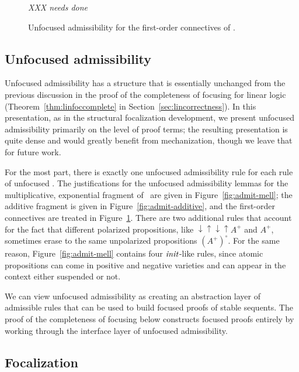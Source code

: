 \begin{figure}[tp]
\centering
{\it XXX needs done}

\caption{Unfocused admissibility for the first-order connectives of \ollll.}
\label{fig:admit-fo}
\end{figure}

\subsection{Unfocused admissibility}
\label{sec:ord-unfocused-admissibility}

Unfocused admissibility has a structure that is essentially unchanged
from the previous discussion in the proof of the completeness of
focusing for linear logic (Theorem~\ref{thm:linfoccomplete} in
Section~\ref{sec:lincorrectness}). In this presentation, as in the
structural focalization development, we present unfocused
admissibility primarily on the level of proof terms; the resulting
presentation is quite dense and would greatly benefit from 
mechanization, though we leave that for future work. 

For the most part, there is exactly one unfocused admissibility rule
for each rule of unfocused \ollll. 
The justifications for the 
unfocused admissibility lemmas for the multiplicative, exponential
fragment of \ollll~are given in Figure~\ref{fig:admit-mell}; the
additive fragment is given in Figure~\ref{fig:admit-additive}, and
the first-order connectives are treated in Figure~\ref{fig:admit-fo}.
There are two additional
rules that account for the fact that different polarized
propositions, like ${\downarrow}{\uparrow}{\downarrow}{\uparrow}A^+$
and $A^+$, sometimes erase to the same unpolarized propositions
$(A^+)^\circ$. 
For the same reason, Figure~\ref{fig:admit-mell} contains four
${\it init}$-like rules, since atomic propositions can come in positive
and negative varieties and can appear in the context either suspended or not.

We can view unfocused admissibility as creating an abstraction layer
of admissible rules that can be used to build focused proofs of stable
sequents.  The proof of the completeness of focusing below constructs
focused proofs entirely by working through the interface layer of
unfocused admissibility.


\subsection{Focalization}

